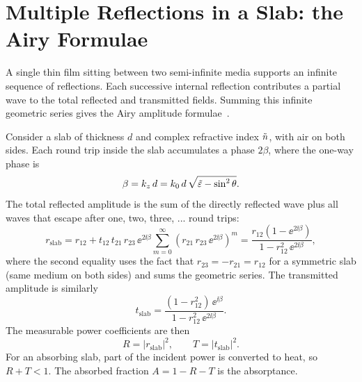 \section{Multiple Reflections in a Slab: the Airy Formulae}

A single thin film sitting between two semi-infinite media supports an
infinite sequence of reflections. Each successive internal reflection
contributes a partial wave to the total reflected and transmitted fields.
Summing this infinite geometric series gives the Airy amplitude
formulae~\cite{hecht}.

Consider a slab of thickness $d$ and complex refractive index $\tilde{n}$, with
air on both sides. Each round trip inside the slab accumulates a phase
$2\beta$, where the one-way phase is
\begin{equation}
  \beta = k_z\,d = k_0\,d\,\sqrt{\tilde{\varepsilon} - \sin^2\theta}.
  \label{eq:ch2_beta}
\end{equation}
The total reflected amplitude is the sum of the directly reflected wave plus
all waves that escape after one, two, three, ... round trips:
\begin{equation}
  r_\text{slab} = r_{12} + t_{12}\,t_{21}\,r_{23}\,\ee^{2\ii\beta}
    \sum_{m=0}^{\infty}(r_{21}\,r_{23}\,\ee^{2\ii\beta})^m
  = \frac{r_{12}(1 - \ee^{2\ii\beta})}{1 - r_{12}^2\,\ee^{2\ii\beta}},
  \label{eq:ch2_rslab}
\end{equation}
where the second equality uses the fact that $r_{23} = -r_{21} = r_{12}$
for a symmetric slab (same medium on both sides) and sums the geometric
series. The transmitted amplitude is similarly
\begin{equation}
  t_\text{slab} = \frac{(1 - r_{12}^2)\,\ee^{\ii\beta}}{1 - r_{12}^2\,\ee^{2\ii\beta}}.
  \label{eq:ch2_tslab}
\end{equation}
The measurable power coefficients are then
\begin{equation}
  R = |r_\text{slab}|^2, \qquad T = |t_\text{slab}|^2.
  \label{eq:ch2_RT}
\end{equation}
For an absorbing slab, part of the incident power is converted to heat, so
$R + T < 1$. The absorbed fraction $A = 1 - R - T$ is the absorptance.

